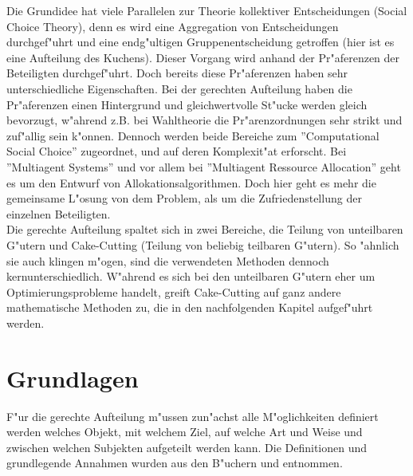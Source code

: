 \documentclass[11pt, a4paper, twoside]{article}
\numberwithin{equation}{section}
\begin{document}
Die Grundidee hat viele Parallelen zur Theorie kollektiver Entscheidungen (Social Choice Theory), denn es wird eine Aggregation von Entscheidungen durchgef"uhrt und eine endg"ultigen Gruppenentscheidung getroffen (hier ist es eine Aufteilung des Kuchens). Dieser Vorgang wird anhand der Pr"aferenzen der Beteiligten durchgef"uhrt. Doch bereits diese Pr"aferenzen haben sehr unterschiedliche Eigenschaften. Bei der gerechten Aufteilung haben die Pr"aferenzen einen Hintergrund und gleichwertvolle St"ucke werden gleich bevorzugt, w"ahrend z.B. bei Wahltheorie die Pr"arenzordnungen sehr strikt und zuf"allig sein k"onnen. Dennoch werden beide Bereiche zum ''Computational Social Choice'' zugeordnet, und auf deren Komplexit"at erforscht. Bei ''Multiagent Systems'' und vor allem bei ''Multiagent Ressource Allocation'' geht es um den Entwurf von Allokationsalgorithmen. Doch hier geht es mehr die gemeinsame L"osung von dem Problem, als um die Zufriedenstellung der einzelnen Beteiligten.\\ 
Die gerechte Aufteilung spaltet sich in zwei Bereiche, die Teilung von unteilbaren G"utern und Cake-Cutting (Teilung von beliebig teilbaren G"utern). So "ahnlich sie auch klingen m"ogen, sind die verwendeten Methoden dennoch kernunterschiedlich. W"ahrend es sich bei den unteilbaren G"utern eher um Optimierungsprobleme handelt, greift Cake-Cutting auf ganz andere mathematische Methoden zu, die in den nachfolgenden Kapitel aufgef"uhrt werden.
\newpage
\section{Grundlagen}
F"ur die gerechte Aufteilung m"ussen zun"achst alle M"oglichkeiten definiert werden welches Objekt, mit welchem Ziel, auf welche Art und Weise und zwischen welchen Subjekten aufgeteilt werden kann. Die Definitionen und grundlegende Annahmen wurden aus den B"uchern \cite{26} und \cite{27} entnommen.
\end{document}
